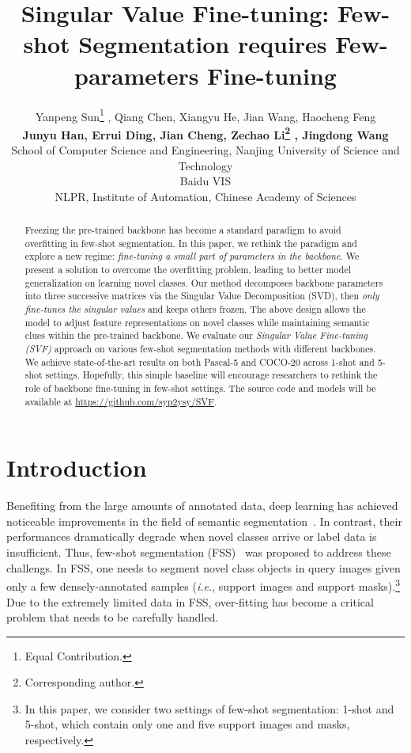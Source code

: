 \documentclass{article}
\title{Singular Value Fine-tuning: Few-shot Segmentation requires Few-parameters Fine-tuning}
\author{
Yanpeng Sun\thanks{Equal Contribution.} , Qiang Chen, Xiangyu He, Jian Wang, Haocheng Feng \\ \textbf{Junyu Han, Errui Ding, Jian Cheng,  Zechao Li\thanks{Corresponding author.} , Jingdong Wang}\\
School of Computer Science and Engineering, Nanjing University of Science and Technology\\
Baidu VIS\\
NLPR, Institute of Automation, Chinese Academy of Sciences\\
}
\begin{document}
\maketitle

\begin{abstract}
\vspace{-.5em}


 



Freezing the pre-trained backbone has become a standard paradigm to avoid overfitting in few-shot segmentation. In this paper, we rethink the paradigm and explore a new regime: {\em fine-tuning a small part of parameters in the backbone}. We present a solution to overcome the overfitting problem, leading to better model generalization on learning novel classes. Our method decomposes backbone parameters into three successive matrices via the Singular Value Decomposition (SVD), then {\em only fine-tunes the singular values} and keeps others frozen. The above design allows the model to adjust feature representations on novel classes while maintaining semantic clues within the pre-trained backbone. We evaluate our {\em Singular Value Fine-tuning (SVF)} approach on various few-shot segmentation methods with different backbones. We achieve state-of-the-art results on both Pascal-5 and COCO-20 across 1-shot and 5-shot settings. Hopefully, this simple baseline will encourage researchers to rethink the role of backbone fine-tuning in few-shot settings. The source code and models will be available at \url{https://github.com/syp2ysy/SVF}.

 
 \vspace{-.9em} 
\end{abstract} \section{Introduction} \label{sec1}
\vspace{-.4em}
Benefiting from the large amounts of annotated data, deep learning has achieved noticeable improvements in the field of semantic segmentation~\cite{yuan2020object,li2021ctnet,TANG2022108792}. In contrast, their performances dramatically degrade when novel classes arrive or label data is insufficient. Thus, few-shot segmentation (FSS)~\cite{lu2021simpler,zhang2020sg} was proposed to address these challengs. In FSS, one needs to segment novel class objects in query images given only a few densely-annotated samples (\textit{i.e.}, support images and support masks).\footnote{In this paper, we consider two settings of few-shot segmentation: 1-shot and 5-shot, which contain only one and five support images and masks, respectively.} Due to the extremely limited data in FSS, over-fitting has become a critical problem that needs to be carefully handled. 
\end{document}
